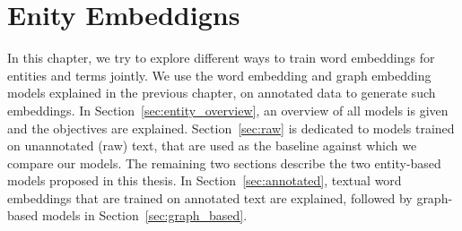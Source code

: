 \chapter{Enity Embeddigns}\label{chap:entity}
In this chapter, we try to explore different ways to train word embeddings for entities and terms jointly. We use the word embedding and graph embedding models explained in the previous chapter, on annotated data to generate such embeddings. In Section~\ref{sec:entity_overview}, an overview of all models is given and the objectives are explained. Section~\ref{sec:raw} is dedicated to models trained on unannotated (raw) text, that are used as the baseline against which we compare our models. The remaining two sections describe the two entity-based models proposed in this thesis. In Section~\ref{sec:annotated},  textual word embeddings that are trained on annotated text are explained, followed by graph-based models in Section~\ref{sec:graph_based}.

